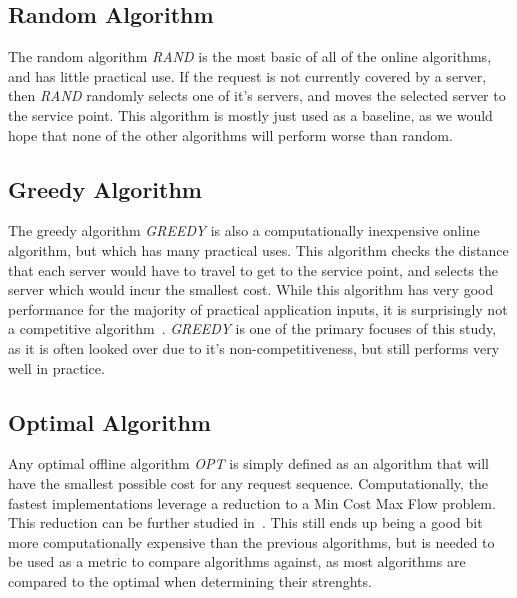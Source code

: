 
\subsection{Random Algorithm}
\label{sec:rand}
The random algorithm \textit{RAND} is the most basic of all of the online algorithms, and has little practical use. If the request is not currently covered by a server, then \textit{RAND} randomly selects one of it's servers, and moves the selected server to the service point. This algorithm is mostly just used as a baseline, as we would hope that none of the other algorithms will perform worse than random.

\subsection{Greedy Algorithm}
\label{sec:greedy}
The greedy algorithm \textit{GREEDY} is also a computationally inexpensive online algorithm, but which has many practical uses. This algorithm checks the distance that each server would have to travel to get to the service point, and selects the server which would incur the smallest cost. While this algorithm has very good performance for the majority of practical application inputs, it is surprisingly not a competitive algorithm~\cite{OnlineComp1998}. \textit{GREEDY} is one of the primary focuses of this study, as it is often looked over due to it's non-competitiveness, but still performs very well in practice.

\subsection{Optimal Algorithm}
\label{sec:OPT}
Any optimal offline algorithm \textit{OPT} is simply defined as an algorithm that will have the smallest possible cost for any request sequence. Computationally, the fastest implementations leverage a reduction to a Min Cost Max Flow problem. This reduction can be further studied in~\cite{WFA2009}. This still ends up being a good bit more computationally expensive than the previous algorithms, but is needed to be used as a metric to compare algorithms against, as most algorithms are compared to the optimal when determining their strenghts.

